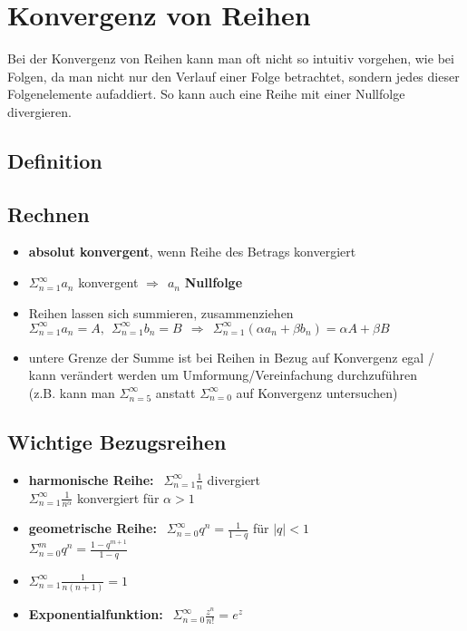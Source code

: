 \documentclass[a4paper,12pt]{article} %
\begin{document}
\section{Konvergenz von Reihen}
Bei der Konvergenz von Reihen kann man oft nicht so intuitiv vorgehen, wie bei Folgen, da man nicht nur den Verlauf einer Folge betrachtet, sondern jedes dieser Folgenelemente aufaddiert. So kann auch eine Reihe mit einer Nullfolge divergieren.
\subsection{Definition}
\begin{center}
\end{center}
\subsection{Rechnen}
\begin{itemize}
\item \textbf{absolut konvergent}, wenn Reihe des Betrags konvergiert
\item $\Sigma_{n=1}^{\infty} a_n$ konvergent $\Rightarrow \ \ a_n $ \textbf{Nullfolge}
\item Reihen lassen sich summieren, zusammenziehen \\
$\Sigma_{n=1}^{\infty} a_n = A , \ \ \Sigma_{n=1}^{\infty} b_n = B \ \ \Rightarrow \ \ \Sigma_{n=1}^{\infty} (\alpha a_n + \beta b_n) = \alpha A + \beta B$
\item untere Grenze der Summe ist bei Reihen in Bezug auf Konvergenz egal / kann verändert werden um Umformung/Vereinfachung durchzuführen\\
(z.B. kann man $\Sigma_{n=5}^{\infty}$ anstatt $\Sigma_{n=0}^{\infty}$ auf Konvergenz untersuchen)
\end{itemize}
\subsection{Wichtige Bezugsreihen}
\begin{itemize}
\item \textbf{harmonische Reihe:} $ \ \ \Sigma_{n=1}^{\infty}\frac{1}{n}$ divergiert\\
$\Sigma_{n=1}^{\infty}\frac{1}{n^\alpha}$ konvergiert für $\alpha > 1$
\item \textbf{geometrische Reihe: } $ \ \ \Sigma_{n=0}^{\infty}q^n = \frac{1}{1-q}$ für $|q| < 1$ \\
$\Sigma_{n=0}^{m} q^n = \frac{1-q^{m+1}}{1-q}$
\item $\Sigma_{n=1}^{\infty} \frac{1}{n(n+1)} = 1$
\item \textbf{Exponentialfunktion:} $ \ \ \Sigma_{n=0}^{\infty} \frac{z^n}{n!} = e^z$
\end{itemize}
\end{document}
